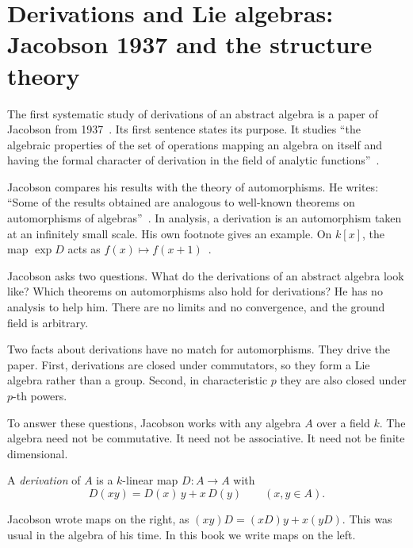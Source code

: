 \section[Derivations and Lie algebras: Jacobson 1937 and the structure theory][Derivations and Lie algebras]{Derivations and Lie algebras: Jacobson 1937 and the structure theory}\label{sec:origins:lie-theory}

The first systematic study of derivations of an abstract algebra is a paper
of Jacobson from 1937~\cite{Jacobson1937}. Its first sentence states its
purpose. It studies ``the algebraic properties of the set of operations
mapping an algebra on itself and having the formal character of derivation
in the field of analytic functions''~\cite[p.~206]{Jacobson1937}.

Jacobson compares his results with the theory of automorphisms. He writes:
``Some of the results obtained are analogous to well-known theorems on
automorphisms of algebras''~\cite[p.~206]{Jacobson1937}. In analysis, a
derivation is an automorphism taken at an infinitely small scale. His own
footnote gives an example. On $k[x]$, the map $\exp D$ acts as
$f(x) \mapsto f(x+1)$~\cite[p.~206]{Jacobson1937}.

Jacobson asks two questions. What do the derivations of an abstract algebra
look like? Which theorems on automorphisms also hold for derivations? He has
no analysis to help him. There are no limits and no convergence, and the
ground field is arbitrary.

Two facts about derivations have no match for automorphisms. They drive the
paper. First, derivations are closed under commutators, so they form a Lie
algebra rather than a group. Second, in characteristic $p$ they are also
closed under $p$-th powers.

To answer these questions, Jacobson works with any algebra $A$ over a field $k$. The algebra need not be
commutative. It need not be associative. It need not be finite dimensional.

\begin{definition}\label{def:origins:jacobson}
A \emph{derivation} of $A$ is a $k$-linear map $D\colon A \to A$ with
\[
D(xy) = D(x)\,y + x\,D(y) \qquad (x, y \in A).
\]
\end{definition}

Jacobson wrote maps on the right, as $(xy)D = (xD)y + x(yD)$. This was usual
in the algebra of his time. In this book we write maps on the left.

